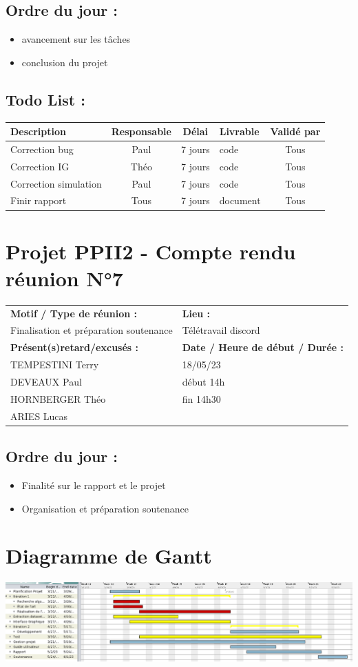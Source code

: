 \documentclass[12pt,titlepage]{report}
\begin{document}
\subsection*{Ordre du jour :}
\begin{itemize}
    \item{avancement sur les tâches}
    \item{conclusion du projet}
\end{itemize}

\subsection*{Todo List :}
\begin{tabular}{|p{3.5cm}|c|c|p{4.5cm}|c|}
    \hline 
    Description & Responsable & Délai & Livrable & Validé par 
    \\ \hline
    Correction bug & Paul & 7 jours & code & Tous \\ \hline
    Correction IG & Théo & 7 jours & code & Tous \\ \hline
    Correction simulation & Paul & 7 jours & code & Tous \\ \hline
    Finir rapport & Tous & 7 jours & document & Tous \\ \hline
\end{tabular}

\newpage

\section*{Projet PPII2 - Compte rendu réunion N°7}
\begin{tabular}{|p{7cm}|p{6cm}|}
    \hline
    \textbf{Motif / Type de réunion :}
    & \textbf{Lieu :}
    \\
    Finalisation et préparation soutenance
    & Télétravail discord
    \\ \hline
    \textbf{Présent(s)retard/excusés :}
    &
    \textbf{Date / Heure de début / Durée :}
    \\ 
    TEMPESTINI Terry &  18/05/23\\  
    DEVEAUX Paul & début 14h\\
    HORNBERGER Théo & fin 14h30\\
    ARIES Lucas & 
    \\ \hline
\end{tabular}

\subsection*{Ordre du jour :}
\begin{itemize}
    \item{Finalité sur le rapport et le projet}
    \item{Organisation et préparation soutenance}
\end{itemize}


\section{Diagramme de Gantt}
\includegraphics[scale=0.5, angle=90]{gantt.png}
\end{document}
